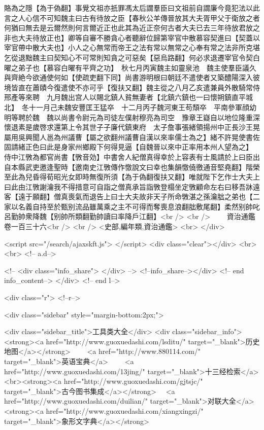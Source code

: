賂為之隱【為于偽翻】事覺文祖亦扺罪馮太后謂羣臣曰文祖前自謂廉今竟犯法以此言之人心信不可知魏主曰古有待放之臣【春秋公羊傳晉放其大夫胥甲父于衛放之者何猶曰無去是云爾然則何言爾近正也此其為近正奈何古者大夫已去三年待放君放之非也大夫待放正也】卿等自審不勝貪心者聽辭位歸第宰官中散慕容契進曰【契蓋以宰官帶中散大夫也】小人之心無常而帝王之法有常以無常之心奉有常之法非所克堪乞從退黜魏主曰契知心不可常則知貪之可惡矣【惡烏路翻】何必求退遷宰官令契白曜之弟子也【慕容白曜有平齊之功】　秋七月丙寅魏主如靈泉池　魏主使羣臣議久與齊絶今欲通使何如【使疏吏翻下同】尚書游明根曰朝廷不遣使者又築醴陽深入彼境皆直在蕭賾今復遣使不亦可乎【復扶又翻】魏主從之八月乙亥遣兼員外散騎常侍邢產等來聘　九月魏出宫人以賜北鎮人貧無妻者【北鎮六鎮也一曰懷朔鎮直平城北】　冬十一月己未魏安豐匡王猛卒　十二月丙子魏河東王苟頹卒　平南參軍顔幼明等聘於魏　魏以尚書令尉元為司徒左僕射穆亮為司空　豫章王嶷自以地位隆重深懷退素是歲啓求還第上令其世子子廉代鎮東府　太子詹事張緒領揚州中正長沙王晃屬用吳興聞人邕為州議曹【屬之欲翻州議曹自漢以來率儒士為之】緒不許晃使書佐固請緒正色曰此是身家州鄉殿下何得見逼【自魏晉以來中正率用本州人望為之】　侍中江斆為都官尚書【斆音効】中書舍人紀僧真得幸於上容表有士風請於上曰臣出自本縣武吏邀逢聖時【邀南史江斆傳作憿說文曰幸也集韻憿僥徼通音堅堯翻】階榮至此為兒昏得荀昭光女即時無復所須【為于偽翻復扶又翻】唯就陛下乞作士大夫上曰此由江斆謝瀹我不得措意可自詣之僧真承旨詣斆登榻坐定斆顧命左右曰移吾牀遠客【遠于願翻】僧真喪氣而退告上曰士大夫故非天子所命斆湛之孫瀹朏之弟也【二家以名義自持至於甄别流品雖萬乘之主不可得而奪喪息浪翻朏敷尾翻】柔然别帥叱呂勤帥衆降魏【别帥所類翻勤帥讀曰率降戶江翻】<br />
<br />
　　資治通鑑卷一百三十六<br />
<br />
<史部,編年類,資治通鑑>  <br>
   </div> 

<script src="/search/ajaxskft.js"> </script>
 <div class="clear"></div>
<br>
<br>
 <!-- a.d-->

 <!--
<div class="info_share">
</div> 
-->
 <!--info_share--></div>   <!-- end info_content-->
  </div> <!-- end l-->

<div class="r">   <!--r-->



<div class="sidebar"  style="margin-bottom:2px;">

 
<div class="sidebar_title">工具类大全</div>
<div class="sidebar_info">
<strong><a href="http://www.guoxuedashi.com/lsditu/" target="_blank">历史地图</a></strong>　　
<a href="http://www.880114.com/" target="_blank">英语宝典</a>　　
<a href="http://www.guoxuedashi.com/13jing/" target="_blank">十三经检索</a>　
<br><strong><a href="http://www.guoxuedashi.com/gjtsjc/" target="_blank">古今图书集成</a></strong>　
<a href="http://www.guoxuedashi.com/duilian/" target="_blank">对联大全</a>　<strong><a href="http://www.guoxuedashi.com/xiangxingzi/" target="_blank">象形文字典</a></strong>　

